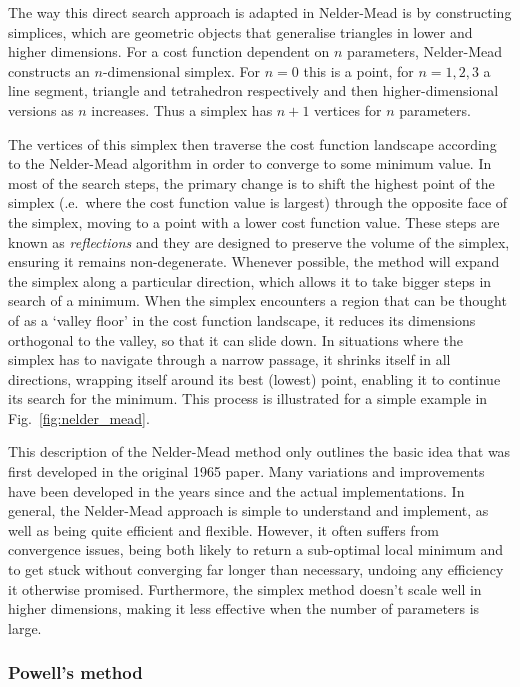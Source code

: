 \documentclass[a4paper,oneside,11pt]{book}
\begin{document}
The way this direct search approach is adapted in Nelder-Mead is by constructing simplices, which are geometric objects that generalise triangles in lower and higher dimensions. For a cost function dependent on $n$ parameters, Nelder-Mead constructs an $n$-dimensional simplex. For $n=0$ this is a point, for $n=1,2,3$ a line segment, triangle and tetrahedron respectively and then higher-dimensional versions as $n$ increases. Thus a simplex has $n+1$ vertices for $n$ parameters. 

The vertices of this simplex then traverse the cost function landscape according to the Nelder-Mead algorithm in order to converge to some minimum value.  In most of the search steps, the primary change is to shift the highest point of the simplex (\@i.e.~where the cost function value is largest) through the opposite face of the simplex, moving to a point with a lower cost function value. These steps are known as \emph{reflections} and they are designed to preserve the volume of the simplex, ensuring it remains non-degenerate. Whenever possible, the method will expand the simplex along a particular direction, which allows it to take bigger steps in search of a minimum. When the simplex encounters a region that can be thought of as a `valley floor' in the cost function landscape, it reduces its dimensions orthogonal to the valley, so that it can slide down. In situations where the simplex has to navigate through a narrow passage, it shrinks itself in all directions, wrapping itself around its best (lowest) point, enabling it to continue its search for the minimum. This process is illustrated for a simple example in Fig.~\ref{fig:nelder_mead}.

This description of the Nelder-Mead method only outlines the basic idea that was first developed in the original 1965 paper. Many variations and improvements have been developed in the years since and the actual implementations. In general, the Nelder-Mead approach is simple to understand and implement, as well as being quite efficient and flexible. However, it often suffers from convergence issues, being both likely to return a sub-optimal local minimum and to get stuck without converging far longer than necessary, undoing any efficiency it otherwise promised. Furthermore, the simplex method doesn't scale well in higher dimensions, making it less effective when the number of parameters is large.

\subsubsection{Powell's method}\label{sec:3.1.3.2_Powell}
\end{document}
